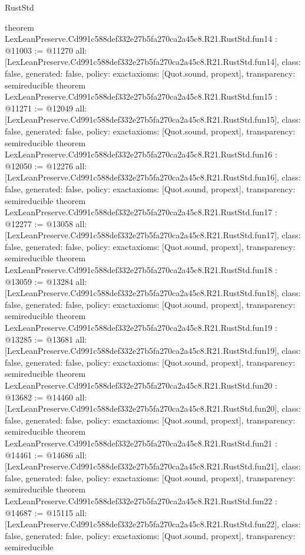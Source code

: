 \begin{lexlean}{RustStd}
\begin{coremodule}
{}
theorem LexLeanPreserve.Cd991c588def332e27b5fa270ca2a45c8.R21.RustStd.fun14 : @11003 := @11270 {
  all: [LexLeanPreserve.Cd991c588def332e27b5fa270ca2a45c8.R21.RustStd.fun14],
  class: false,
  generated: false,
  policy: exact{axioms: [Quot.sound, propext]},
  transparency: semireducible
}
theorem LexLeanPreserve.Cd991c588def332e27b5fa270ca2a45c8.R21.RustStd.fun15 : @11271 := @12049 {
  all: [LexLeanPreserve.Cd991c588def332e27b5fa270ca2a45c8.R21.RustStd.fun15],
  class: false,
  generated: false,
  policy: exact{axioms: [Quot.sound, propext]},
  transparency: semireducible
}
theorem LexLeanPreserve.Cd991c588def332e27b5fa270ca2a45c8.R21.RustStd.fun16 : @12050 := @12276 {
  all: [LexLeanPreserve.Cd991c588def332e27b5fa270ca2a45c8.R21.RustStd.fun16],
  class: false,
  generated: false,
  policy: exact{axioms: [Quot.sound, propext]},
  transparency: semireducible
}
theorem LexLeanPreserve.Cd991c588def332e27b5fa270ca2a45c8.R21.RustStd.fun17 : @12277 := @13058 {
  all: [LexLeanPreserve.Cd991c588def332e27b5fa270ca2a45c8.R21.RustStd.fun17],
  class: false,
  generated: false,
  policy: exact{axioms: [Quot.sound, propext]},
  transparency: semireducible
}
theorem LexLeanPreserve.Cd991c588def332e27b5fa270ca2a45c8.R21.RustStd.fun18 : @13059 := @13284 {
  all: [LexLeanPreserve.Cd991c588def332e27b5fa270ca2a45c8.R21.RustStd.fun18],
  class: false,
  generated: false,
  policy: exact{axioms: [Quot.sound, propext]},
  transparency: semireducible
}
theorem LexLeanPreserve.Cd991c588def332e27b5fa270ca2a45c8.R21.RustStd.fun19 : @13285 := @13681 {
  all: [LexLeanPreserve.Cd991c588def332e27b5fa270ca2a45c8.R21.RustStd.fun19],
  class: false,
  generated: false,
  policy: exact{axioms: [Quot.sound, propext]},
  transparency: semireducible
}
theorem LexLeanPreserve.Cd991c588def332e27b5fa270ca2a45c8.R21.RustStd.fun20 : @13682 := @14460 {
  all: [LexLeanPreserve.Cd991c588def332e27b5fa270ca2a45c8.R21.RustStd.fun20],
  class: false,
  generated: false,
  policy: exact{axioms: [Quot.sound, propext]},
  transparency: semireducible
}
theorem LexLeanPreserve.Cd991c588def332e27b5fa270ca2a45c8.R21.RustStd.fun21 : @14461 := @14686 {
  all: [LexLeanPreserve.Cd991c588def332e27b5fa270ca2a45c8.R21.RustStd.fun21],
  class: false,
  generated: false,
  policy: exact{axioms: [Quot.sound, propext]},
  transparency: semireducible
}
theorem LexLeanPreserve.Cd991c588def332e27b5fa270ca2a45c8.R21.RustStd.fun22 : @14687 := @15115 {
  all: [LexLeanPreserve.Cd991c588def332e27b5fa270ca2a45c8.R21.RustStd.fun22],
  class: false,
  generated: false,
  policy: exact{axioms: [Quot.sound, propext]},
  transparency: semireducible
}
\end{coremodule}
\end{lexlean}
